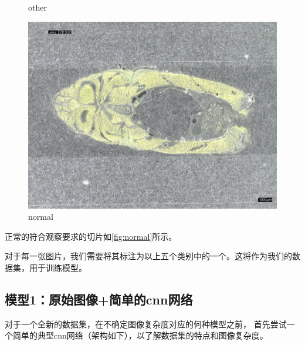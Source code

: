 \begin{figure}[H]
\begin{minipage}{0.32\textwidth}
        \caption{other}
        \label{fig:other}
    \end{minipage}
    \begin{minipage}{0.32\textwidth}
        \centering
        \includegraphics[width=\textwidth]{./fig/sample_1/normal.jpg}
        \caption{normal}
        \label{fig:normal}
    \end{minipage}
\end{figure}

正常的符合观察要求的切片如\autoref{fig:normal}所示。

对于每一张图片，我们需要将其标注为以上五个类别中的一个。这将作为我们的数据集，用于训练模型。


\FloatBarrier

\subsection{模型1：原始图像+简单的cnn网络}

对于一个全新的数据集，在不确定图像复杂度对应的何种模型之前，
首先尝试一个简单的典型cnn网络（架构如下），以了解数据集的特点和图像复杂度。


